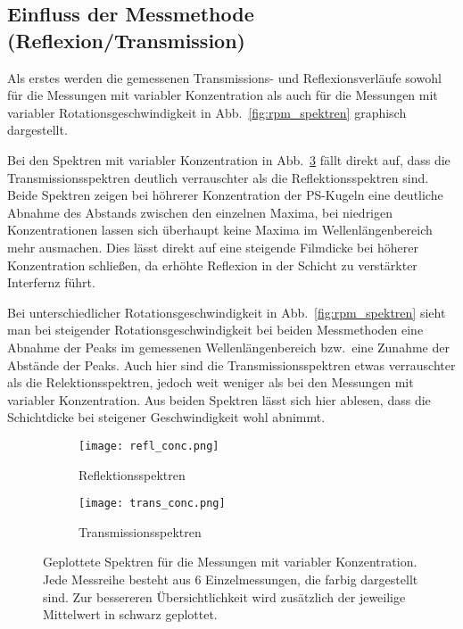 \subsection{Einfluss der Messmethode (Reflexion/Transmission) \label{sec:einflussmethode}}

Als erstes werden die gemessenen Transmissions- und Reflexionsverläufe sowohl für die Messungen mit variabler Konzentration als auch für die Messungen mit variabler Rotationsgeschwindigkeit in Abb.~\ref{fig:rpm_spektren} graphisch dargestellt. 

Bei den Spektren mit variabler Konzentration in Abb.~\ref{fig:conc_spektren} fällt direkt auf, dass die Transmissionsspektren deutlich verrauschter als die Reflektionsspektren sind. Beide Spektren zeigen bei höhrerer Konzentration der PS-Kugeln eine deutliche Abnahme des Abstands zwischen den einzelnen Maxima, bei niedrigen Konzentrationen lassen sich überhaupt keine Maxima im Wellenlängenbereich mehr ausmachen. Dies lässt direkt auf eine steigende Filmdicke bei höherer Konzentration schließen, da erhöhte Reflexion in der Schicht zu verstärkter Interfernz führt.

Bei unterschiedlicher Rotationsgeschwindigkeit in Abb.~\ref{fig:rpm_spektren} sieht man bei steigender Rotationsgeschwindigkeit bei beiden Messmethoden eine Abnahme der Peaks im gemessenen Wellenlängenbereich bzw.~eine Zunahme der Abstände der Peaks. Auch hier sind die Transmissionsspektren etwas verrauschter als die Relektionsspektren, jedoch weit weniger als bei den Messungen mit variabler Konzentration. Aus beiden Spektren lässt sich hier ablesen, dass die Schichtdicke bei steigener Geschwindigkeit wohl abnimmt.

\begin{figure}[h!]
    \centering
    \begin{subfigure}{.5\textwidth}
      \centering
      \texttt{[image: refl\_conc.png]}
      \caption{Reflektionsspektren}
      \label{fig:refl_conc}
    \end{subfigure}%
    \begin{subfigure}{.5\textwidth}
      \centering
      \texttt{[image: trans\_conc.png]}
      \caption{Transmissionsspektren}
      \label{fig:refl_trans}
    \end{subfigure}
    \caption{Geplottete Spektren für die Messungen mit variabler Konzentration. Jede Messreihe besteht aus 6 Einzelmessungen, die farbig dargestellt sind. Zur bessereren Übersichtlichkeit wird zusätzlich der jeweilige Mittelwert in schwarz geplottet.}
    \label{fig:conc_spektren}
\end{figure}

